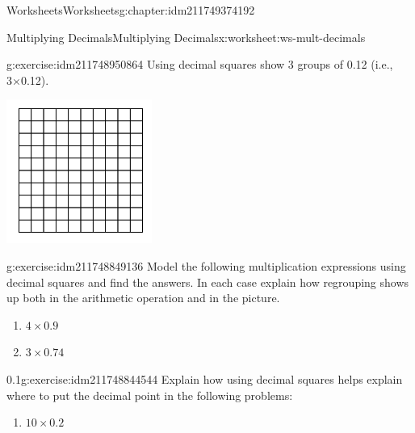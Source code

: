 \documentclass[twoside,11pt,]{book}
\begin{document}
\begin{chapterptx}{Worksheets}{}{Worksheets}{}{}{g:chapter:idm211749374192}
\begin{worksheet-section-numberless}{Multiplying Decimals}{}{Multiplying Decimals}{}{}{x:worksheet:ws-mult-decimals}
\begin{divisionexercise}{1}{}{}{g:exercise:idm211748950864}
Using decimal squares show 3 groups of 0.12 (i.e., 3×0.12).%
\begin{sidebyside}{1}{0.25}{0.25}{0}%
\begin{sbspanel}{0.5}%
\includegraphics[width=1\linewidth]{images/decimal-square.png}
\end{sbspanel}%
\end{sidebyside}%
\end{divisionexercise}%
\begin{divisionexercise}{2}{}{}{g:exercise:idm211748849136}%
Model the following multiplication expressions using decimal squares and find the answers. In each case explain how regrouping shows up both in the arithmetic operation and in the picture.%
%
\begin{enumerate}[label=(\alph*)]
\item{}\(4 \times 0.9 \)%
\item{}\(3 \times 0.74 \)%
\end{enumerate}
\end{divisionexercise}%
\begin{divisionexercise}{3}{}{0.1}{g:exercise:idm211748844544}%
Explain how using decimal squares helps explain where to put the decimal point in the following problems:%
%
\begin{enumerate}[label=(\alph*)]
\item{}\(10 \times 0.2 \)%

\end{enumerate}
\end{divisionexercise}
\end{worksheet-section-numberless}
\end{chapterptx}
\end{document}
